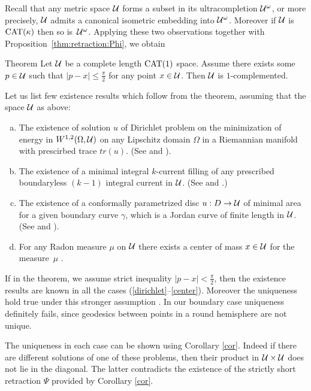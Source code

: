 \documentclass[oneside,a4paper, 12pt]{article}
\begin{document}
Recall that any metric space ${\mathcal{U}}$ forms a subset in its ultracompletion ${\mathcal{U}}^{\omega}$, or more precisely, ${\mathcal{U}}$ admits a canonical isometric embedding into ${\mathcal{U}}^{\omega}$.
Moreover if ${\mathcal{U}}$ is $\mathrm{CAT}(\kappa)$ then so is~${\mathcal{U}}^\omega$. 
Applying these two observations together with Proposition~\ref{thm:retraction:Phi}, we obtain

\begin{thm}{Theorem}\label{thm:complemented}
Let ${\mathcal{U}}$ be a complete length $\mathrm{CAT}(1)$ space.
Assume  there exists some $p\in {\mathcal{U}}$ such that $|p-x|\le \tfrac\pi2$ for any point $x\in {\mathcal{U}}$.
Then ${\mathcal{U}}$ is $1$-complemented.
\end{thm}

Let us list few existence results which follow from the theorem, assuming that the space ${\mathcal{U}}$ as above:
\begin{enumerate}[(a)]
\item\label{dirichlet}   The existence of solution $u$ of Dirichlet problem on the minimization of energy 
in $W^{1,2} (\Omega, {\mathcal{U}})$ on any Lipschitz domain $\Omega$ in a Riemannian manifold with prescirbed trace $tr(u)$.
(See \cite{KS} and \cite[Theorem 1.4]{guo-wenger}).
\item The existence of a minimal integral $k$-current filling of any prescribed boundaryless $(k-1)$ integral current in ${\mathcal{U}}$. 
(See \cite{Ambrosio} and \cite[Theorem 3.3]{Wenger-1comp}.)
\item   The existence of a conformally parametrized disc $u:D\to {\mathcal{U}}$ of minimal area for a given boundary curve $\gamma$, which is a Jordan curve of finite length in ${\mathcal{U}}$.
(See \cite{LWplateau} and \cite[Theorem 1.2]{guo-wenger}).
\item\label{center} For any Radon measure $\mu$ on ${\mathcal{U}}$ there exists a center of mass $x\in {\mathcal{U}}$ for the measure~$\mu$ \cite{Sturm, yokota}.
\end{enumerate}

If in the theorem, we assume strict inequality $|p-x|< \tfrac\pi2$, then the existence results are known  in all the cases (\ref{dirichlet}--\ref{center}).
Moreover the uniqueness hold true under this stronger assumption
\cite{yokota,serbinowski}.
In our boundary case uniqueness definitely fails, since geodesics between points in a round hemisphere are not unique.

The uniqueness in each case can be shown using Corollary \ref{cor}.
Indeed if there are different solutions of one of these problems, then their product in ${\mathcal{U}}\times {\mathcal{U}}$ does not lie in the diagonal.
The latter contradicts the existence of the strictly short retraction $\Psi$ provided by Corollary \ref{cor}.
\end{document}
